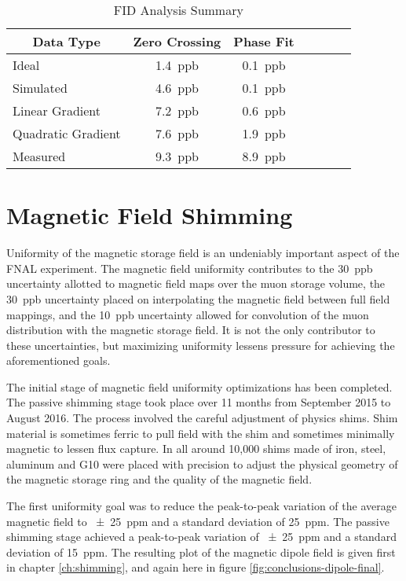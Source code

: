 \begin{table}[h]
\label{tab:conclusion-fid-summary}
\caption{FID Analysis Summary}
\centering
\begin{tabular}{l c c c c c c}
    \hline
    \multicolumn{1}{c}{Data Type} & Zero Crossing & Phase Fit \\
    \hline
    Ideal                & \SI{1.4}{ppb}  & \SI{0.1}{ppb} \\
    Simulated            & \SI{4.6}{ppb}  & \SI{0.1}{ppb} \\
    Linear Gradient      & \SI{7.2}{ppb}  & \SI{0.6}{ppb} \\
    Quadratic Gradient   & \SI{7.6}{ppb}  & \SI{1.9}{ppb} \\
    Measured             & \SI{9.3}{ppb}  & \SI{8.9}{ppb} \\
    \hline
\end{tabular}
\end{table}

\section{Magnetic Field Shimming}

Uniformity of the magnetic storage field is an undeniably important aspect of the FNAL \mugmtwo experiment.  The magnetic field uniformity contributes to the \SI{30}{ppb} uncertainty allotted to magnetic field maps over the muon storage volume, the \SI{30}{ppb} uncertainty placed on interpolating the magnetic field between full field mappings, and the \SI{10}{ppb} uncertainty allowed for convolution of the muon distribution with the magnetic storage field. It is not the only contributor to these uncertainties, but maximizing uniformity lessens pressure for achieving the aforementioned goals.

The initial stage of magnetic field uniformity optimizations has been completed.  The passive shimming stage took place over 11 months from September 2015 to August 2016.  The process involved the careful adjustment of physics shims.  Shim material is sometimes ferric to pull field with the shim and sometimes minimally magnetic to lessen flux capture.  In all around 10,000 shims made of iron, steel, aluminum and G10 were placed with precision to adjust the physical geometry of the magnetic storage ring and the quality of the magnetic field.

The first uniformity goal was to reduce the peak-to-peak variation of the average magnetic field to \SI{\pm 25}{ppm} and a standard deviation of \SI{25}{ppm}.  The passive shimming stage achieved a peak-to-peak variation of \SI{\pm 25}{ppm} and a standard deviation of \SI{15}{ppm}.  The resulting plot of the magnetic dipole field is given first in chapter \ref{ch:shimming}, and again here in figure \ref{fig:conclusions-dipole-final}.

